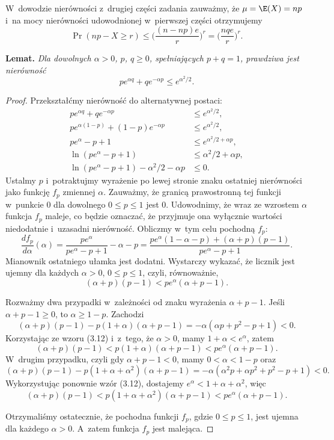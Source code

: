 W~dowodzie nierówności z~drugiej części zadania zauważmy, że $\mu=\E(X)=np$ i~na mocy nierówności udowodnionej w~pierwszej części otrzymujemy
\[
    \Pr(np-X\ge r) \le \biggl(\frac{(n-np)e}{r}\biggr)^r = \biggl(\frac{nqe}{r}\biggr)^r.
\]

\exercise %

\noindent\textsf{\textbf{Lemat.}} \textit{Dla dowolnych $\alpha>0$, \/$p$, \/$q\ge0$, spełniających\/ $p+q=1$, prawdziwa jest nierówność}
	\[
		pe^{\alpha q}+qe^{-\alpha p} \le e^{\alpha^2\!/2}.
	\]
\begin{proof}
	Przekształćmy nierówność do alternatywnej postaci:
	\begin{align*}
		pe^{\alpha q}+qe^{-\alpha p} &\le e^{\alpha^2\!/2}, \\
		pe^{\alpha(1-p)}+(1-p)e^{-\alpha p} &\le e^{\alpha^2\!/2}, \\
		pe^\alpha-p+1 &\le e^{\alpha^2\!/2+\alpha p}, \\
		\ln(pe^\alpha-p+1) &\le \alpha^2\!/2+\alpha p, \\
		\ln(pe^\alpha-p+1)-\alpha^2\!/2-\alpha p &\le 0.
	\end{align*}
	Ustalmy $p$ i~potraktujmy wyrażenie po lewej stronie znaku ostatniej nierówności jako funkcję $f_p$ zmiennej $\alpha$.
Zauważmy, że granicą prawostronną tej funkcji w~punkcie 0 dla dowolnego $0\le p\le1$ jest 0.
Udowodnimy, że wraz ze wzrostem $\alpha$ funkcja $f_p$ maleje, co będzie oznaczać, że przyjmuje ona wyłącznie wartości niedodatnie i~uzasadni nierówność.
Obliczmy w~tym celu pochodną $f_p$:
	\[
	    \frac{df_p}{d\alpha}(\alpha) = \frac{pe^\alpha}{pe^\alpha-p+1}-\alpha-p = \frac{pe^\alpha(1-\alpha-p)+(\alpha+p)(p-1)}{pe^\alpha-p+1}.
	\]
	Mianownik ostatniego ułamka jest dodatni.
Wystarczy wykazać, że licznik jest ujemny dla każdych $\alpha>0$, $0\le p\le1$, czyli, równoważnie,
	\[
	    (\alpha+p)(p-1) < pe^\alpha(\alpha+p-1).
	\]

	Rozważmy dwa przypadki w~zależności od znaku wyrażenia $\alpha+p-1$.
Jeśli $\alpha+p-1\ge0$, to $\alpha\ge1-p$.
Zachodzi
	\[
	    (\alpha+p)(p-1)-p(1+\alpha)(\alpha+p-1) = -\alpha(\alpha p+p^2-p+1) < 0.
	\]
	Korzystając ze wzoru (3.12) i~z~tego, że $\alpha>0$, mamy $1+\alpha<e^\alpha$, zatem
	\[
	    (\alpha+p)(p-1) < p(1+\alpha)(\alpha+p-1) < pe^\alpha(\alpha+p-1).
	\]
	W~drugim przypadku, czyli gdy $\alpha+p-1<0$, mamy $0<\alpha<1-p$ oraz
	\[
	    (\alpha+p)(p-1)-p(1+\alpha+\alpha^2)(\alpha+p-1) = -\alpha(\alpha^2p+\alpha p^2+p^2-p+1) < 0.
	\]
	Wykorzystując ponownie wzór (3.12), dostajemy $e^\alpha<1+\alpha+\alpha^2$, więc
	\[
		(\alpha+p)(p-1) < p(1+\alpha+\alpha^2)(\alpha+p-1) < pe^\alpha(\alpha+p-1).
	\]

	Otrzymaliśmy ostatecznie, że pochodna funkcji $f_p$, gdzie $0\le p\le1$, jest ujemna dla każdego $\alpha>0$.
A~zatem funkcja $f_p$ jest malejąca.
\end{proof}

